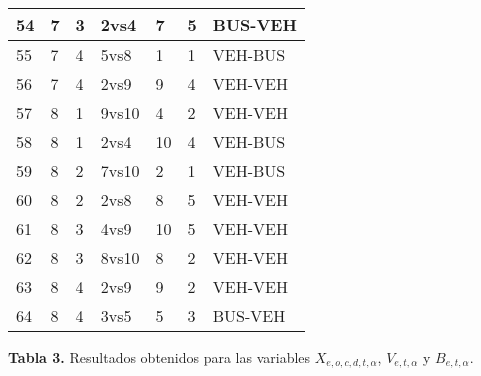 \begin{center}
\begin{tabular}{|l|l|l|l|l|l|l|}
54 & 7 & 3 & 2vs4 & 7 & 5 & BUS-VEH \\ \hline
55 & 7 & 4 & 5vs8 & 1 & 1 & VEH-BUS \\ \hline
56 & 7 & 4 & 2vs9 & 9 & 4 & VEH-VEH \\ \hline
57 & 8 & 1 & 9vs10 & 4 & 2 & VEH-VEH \\ \hline
58 & 8 & 1 & 2vs4 & 10 & 4 & VEH-BUS \\ \hline
59 & 8 & 2 & 7vs10 & 2 & 1 & VEH-BUS \\ \hline
60 & 8 & 2 & 2vs8 & 8 & 5 & VEH-VEH \\ \hline
61 & 8 & 3 & 4vs9 & 10 & 5 & VEH-VEH \\ \hline
62 & 8 & 3 & 8vs10 & 8 & 2 & VEH-VEH \\ \hline
63 & 8 & 4 & 2vs9 & 9 & 2 & VEH-VEH \\ \hline
64 & 8 & 4 & 3vs5 & 5 & 3 & BUS-VEH \\ \hline

\end{tabular}
\vspace{5pt}

\footnotesize{\textbf{Tabla 3.} Resultados obtenidos para las variables $X_{e,o,c,d,t,\alpha}$, $V_{e,t,\alpha}$ y $B_{e,t,\alpha}$.}

\end{center}
